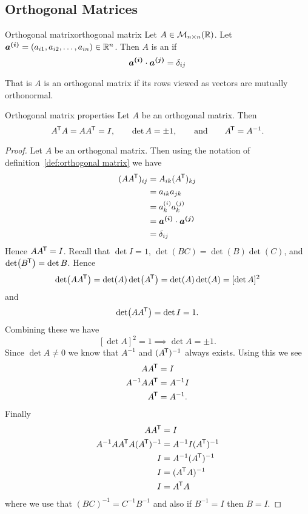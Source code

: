 \documentclass[a4paper]{article}
\newcommand{\nxmMatrices}[3]{\mathcal{M}_{{#1}\times{#2}}({#3})}
\begin{document}
    \subsection{Orthogonal Matrices}
    \begin{definition}{Orthogonal matrix}{orthogonal matrix}
        Let \(A\in \nxmMatrices{n}{n}{\reals}\).
        Let \(\bm{a^{(i)}} = (a_{i1}, a_{i2}, \dotsc, a_{in}) \in\mathbb{R}^n\).
        Then \(A\) is an  if
        \[\bm{a^{(i)}}\cdot\bm{a^{(j)}} = \delta_{ij}\]
    \end{definition}
    That is \(A\) is an orthogonal matrix if its rows viewed as vectors are mutually orthonormal.
    \begin{theorem}{Orthogonal matrix properties}{}
        Let \(A\) be an orthogonal matrix.
        Then
        \[A^{\mkern-1.5mu\mathsf{T}} A = AA^{\mkern-1.5mu\mathsf{T}} = I, \qquad \det A = \pm 1, \qquad\text{and}\qquad A^{\mkern-1.5mu\mathsf{T}} = A^{-1}.\]
    \end{theorem}
    \begin{proof}
        Let \(A\) be an orthogonal matrix.
        Then using the notation of definition~\ref{def:orthogonal matrix} we have
        \begin{align*}
            (AA^{\mkern-1.5mu\mathsf{T}})_{ij} &= A_{ik}(A^{\mkern-1.5mu\mathsf{T}})_{kj}\\
            &= a_{ik}a_{jk}\\
            &= a^{(i)}_ka^{(j)}_k\\
            &= \bm{a^{(i)}}\cdot\bm{a^{(j)}}\\
            &= \delta_{ij}
        \end{align*}
        Hence \(AA^{\mkern-1.5mu\mathsf{T}} = I\).
        Recall that \(\det I = 1\), \(\det(BC) = \det(B)\det(C)\), and \(\det(B^{\mkern-1.5mu\mathsf{T}}) = \det B\).
        Hence
        \[\det(AA^{\mkern-1.5mu\mathsf{T}}) = \det(A)\det(A^{\mkern-1.5mu\mathsf{T}}) = \det(A)\det(A) = [\det A]^2\]
        and
        \[\det(AA^{\mkern-1.5mu\mathsf{T}}) = \det I = 1.\]
        Combining these we have
        \[[\det A]^2 = 1\implies \det A = \pm 1.\]
        Since \(\det A \ne 0\) we know that \(A^{-1}\) and \((A^{\mkern-1.5mu\mathsf{T}})^{-1}\) always exists.
        Using this we see
        \begin{align*}
            AA^{\mkern-1.5mu\mathsf{T}} &= I\\
            A^{-1}AA^{\mkern-1.5mu\mathsf{T}} &= A^{-1}I\\
            A^{\mkern-1.5mu\mathsf{T}} &= A^{-1}.
        \end{align*}
        Finally
        \begin{align*}
            AA^{\mkern-1.5mu\mathsf{T}} &= I\\
            A^{-1}AA^{\mkern-1.5mu\mathsf{T}} A(A^{\mkern-1.5mu\mathsf{T}})^{-1} &= A^{-1}I(A^{\mkern-1.5mu\mathsf{T}})^{-1}\\
            I &= A^{-1}(A^{\mkern-1.5mu\mathsf{T}})^{-1}\\
            I &= (A^{\mkern-1.5mu\mathsf{T}} A)^{-1}\\
            I &= A^{\mkern-1.5mu\mathsf{T}} A
        \end{align*}
        where we use that \((BC)^{-1} = C^{-1}B^{-1}\) and also if \(B^{-1} = I\) then \(B = I\).
        \end{proof}
\end{document}
